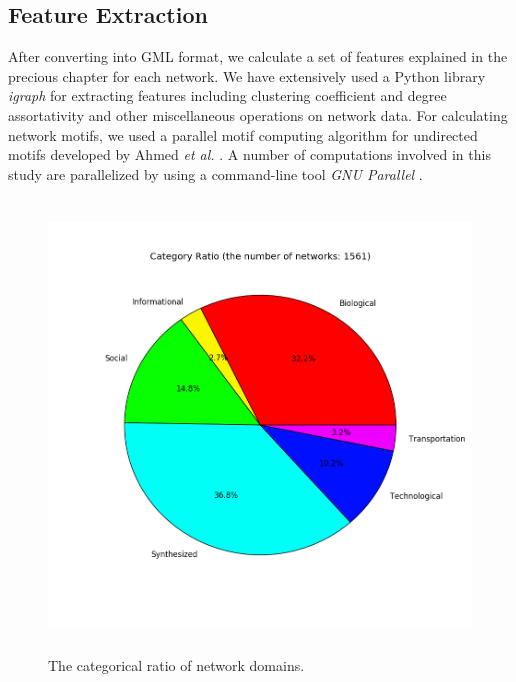 \documentclass{article}
\begin{document}
	\subsection{Feature Extraction}
	After converting into GML format, we calculate a set of features explained in the precious chapter for each network. We have extensively used a Python library \textit{igraph} \cite{igraph} for extracting features including clustering coefficient and degree assortativity and other miscellaneous operations on network data. For calculating network motifs, we used a parallel motif computing algorithm for undirected motifs developed by Ahmed \textit{et al.} \cite{ahmed2015icdm}. A number of computations involved in this study are parallelized by using a command-line tool \textit{GNU Parallel} \cite{GNUParallel}.
	
	\begin{figure}[ht]
	\begin{center}
		\vspace{0.5cm}
		\includegraphics[clip,width=12cm,height = 12cm]{figs/category_ratio.png}
		\vspace{0.5cm}
		\caption{The categorical ratio of network domains.}
		\label{domain_ratio}
	\end{center}
	\end{figure}
	
\end{document}
